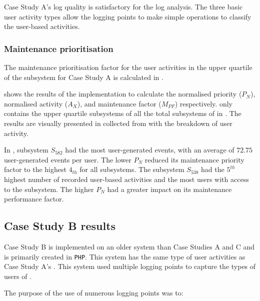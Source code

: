 Case Study A's log quality is satisfactory for the log analysis. The three basic user activity types allow the logging points to make simple operations to classify the user-based activities. 

\clearpage

\subsubsection{Maintenance prioritisation}
The maintenance prioritisation factor for the user activities in the upper quartile of the subsystem for Case Study A is calculated in .



 shows the results of the implementation  to calculate the normalised priority ($P_N$), normalised activity ($A_X$), and maintenance factor ($M_{PF}$) respectively.  only contains the upper quartile subsystems of all the total subsystems of  in . The results are visually presented in  collected from  with the breakdown of user activity. \par In , subsystem $S_{582}$ had the most user-generated events, with an average of $72.75$ user-generated events per user. The lower $P_N$ reduced its maintenance priority factor to the highest $4_{th}$ for all subsystems. The subsystem $S_{538}$ had the $5^{th}$ highest number of recorded user-based activities and the most users with access to the subsystem. The higher $P_N$ had a greater impact on its maintenance performance factor. 

\clearpage

\subsection{Case Study B results}\label{sec:ch3_csB}
Case Study B is implemented on an older system than Case Studies A and C and is primarily created in \texttt{PHP}. This system has the same type of user activities as Case Study A's . This system used multiple logging points to capture the types of users of . \par The purpose of the use of numerous logging points was to:

